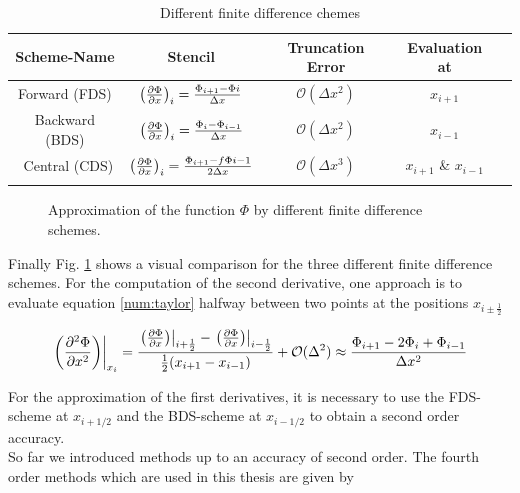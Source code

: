 \bgroup\large
\begin{table}[!bp]
\centering
\def\arraystretch{1.5}%
\begin{tabular}{c c c c c}\toprule
Scheme-Name & Stencil & Truncation Error & Evaluation at\\[0.5ex]
\midrule
Forward  (FDS) & $\left(\pdn[\Phi]{x}\right)_i =  \frac{\Phi_{i+1} - \Phi{i}}   {\Delta x}$ & $\mathcal{O}(\Delta x^2)$  &$x_{i+1}$\\
Backward (BDS) & $\left(\pdn[\Phi]{x}\right)_i = \frac{\Phi_{i}    - \Phi_{i-1}}{\Delta x}$  &$ \mathcal{O}(\Delta x^2)$ & $x_{i-1}$\\\
Central  (CDS) & $\left(\pdn[\Phi]{x}\right)_i = \frac{\Phi_{i+1}  - f\Phi{i-1}}{2\Delta x}$ &$ \mathcal{O}(\Delta x^3)$& $x_{i+1}$ \& $x_{i-1}$\\
\\
\bottomrule
\end{tabular}
\caption{Different finite difference chemes}
\label{num:df_table}
\end{table}
\egroup

\clearpage

\begin{figure}[!btp]
  \centering
  \caption{Approximation of the function $\Phi$ by different finite difference schemes.}
  \label{num:fd_image}
\end{figure}

Finally Fig. \ref{num:fd_image} shows a visual comparison for the three different finite difference schemes.
For the computation of the second derivative, one approach is to evaluate equation \ref{num:taylor} halfway between two points at the positions $x_{i\pm\frac{1}{2}}$

\begin{align}
    \label{numerik:eq_2dfo2}
    \left.\left(\pdn[^2\Phi]{x^2}\right)\right|_{x_i} =
     \frac{\left.\left(\pdn[\Phi]{x}\right)\right|_{i+\frac{1}{2}}-
     \left.\left(\pdn[\Phi]{x}\right)\right|_{i-\frac{1}{2}}}
    {\frac{1}{2}(x_{i+1} - x_{i-1})} + \mathcal{O}(\Delta ^2)  \approx
    \frac{\Phi_{i+1} - 2\Phi_i + \Phi_{i-1}}{\Delta x^2}
\end{align}

For the approximation of the first derivatives, it is necessary to use the FDS-scheme at $x_{i+1/2}$ and the BDS-scheme at $x_{i-1/2}$ to obtain
a second order accuracy.\\
So far we introduced methods up to an accuracy of second order. The fourth order methods which are used in this thesis are given by

